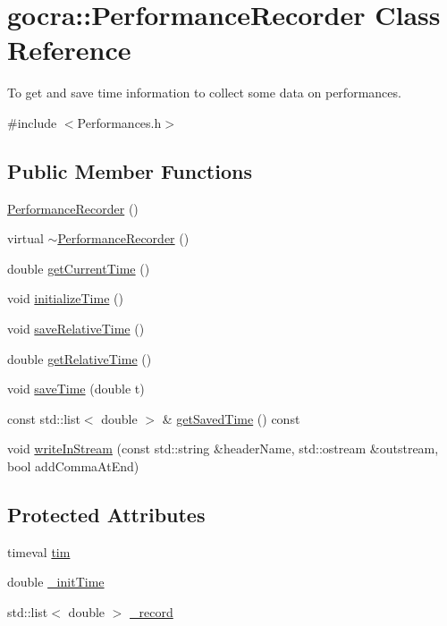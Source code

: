 \hypertarget{classgocra_1_1PerformanceRecorder}{}\section{gocra\+:\+:Performance\+Recorder Class Reference}
\label{classgocra_1_1PerformanceRecorder}


To get and save time information to collect some data on performances.  




{\ttfamily \#include $<$Performances.\+h$>$}

\subsection*{Public Member Functions}
\begin{DoxyCompactItemize}
\item 
\hyperlink{classgocra_1_1PerformanceRecorder_a65ac4c19828090b5c20b15d17cec3cd6}{Performance\+Recorder} ()
\item 
virtual \hyperlink{classgocra_1_1PerformanceRecorder_afc202dd11f2fc8fdacec3022e01946c2}{$\sim$\+Performance\+Recorder} ()
\item 
double \hyperlink{classgocra_1_1PerformanceRecorder_a96c4be3089ddcddeb69c2335108da0bf}{get\+Current\+Time} ()
\item 
void \hyperlink{classgocra_1_1PerformanceRecorder_ac0a5ac7aa54b9abc0a4c25cd291dbee9}{initialize\+Time} ()
\item 
void \hyperlink{classgocra_1_1PerformanceRecorder_a7cfcd7b0e29626e2e2a14ad4ef3bf553}{save\+Relative\+Time} ()
\item 
double \hyperlink{classgocra_1_1PerformanceRecorder_aed74024b507ec92e6ef6a3821f70f047}{get\+Relative\+Time} ()
\item 
void \hyperlink{classgocra_1_1PerformanceRecorder_aeb8e111c5e7a65ed384d39569ab1bbef}{save\+Time} (double t)
\item 
const std\+::list$<$ double $>$ \& \hyperlink{classgocra_1_1PerformanceRecorder_a455aa6ce738511632d968b16632f8994}{get\+Saved\+Time} () const
\item 
void \hyperlink{classgocra_1_1PerformanceRecorder_a47f171510d0f7129bf588fe5c2417043}{write\+In\+Stream} (const std\+::string \&header\+Name, std\+::ostream \&outstream, bool add\+Comma\+At\+End)
\end{DoxyCompactItemize}
\subsection*{Protected Attributes}
\begin{DoxyCompactItemize}
\item 
timeval \hyperlink{classgocra_1_1PerformanceRecorder_ab953e4252c10603dc8c25634f471db5a}{tim}
\item 
double \hyperlink{classgocra_1_1PerformanceRecorder_a45440c78a3cd0f651d5b18f0b4a268c7}{\+\_\+init\+Time}
\item 
std\+::list$<$ double $>$ \hyperlink{classgocra_1_1PerformanceRecorder_ad68f215e892c377e5dda90f883d00714}{\+\_\+record}
\end{DoxyCompactItemize}


